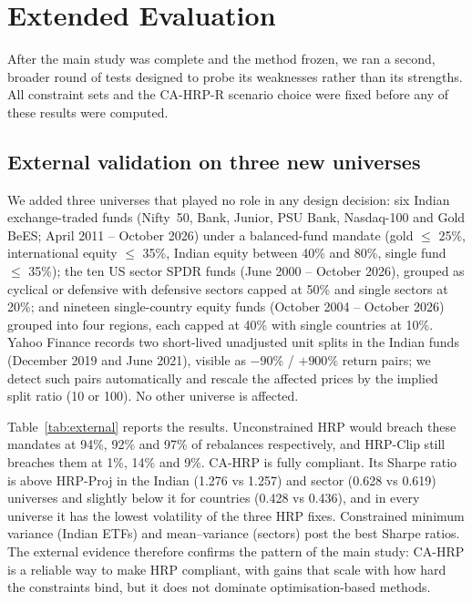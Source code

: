 \section{Extended Evaluation}\label{sec:extended}

After the main study was complete and the method frozen, we ran a second, broader round of
tests designed to probe its weaknesses rather than its strengths. All constraint sets and
the CA-HRP-R scenario choice were fixed before any of these results were computed.

\subsection{External validation on three new universes}
We added three universes that played no role in any design decision: six Indian
exchange-traded funds (Nifty~50, Bank, Junior, PSU Bank, Nasdaq-100 and Gold BeES; April
2011 -- October 2026) under a balanced-fund mandate (gold $\le$ 25\%, international equity
$\le$ 35\%, Indian equity between 40\% and 80\%, single fund $\le$ 35\%); the ten US sector
SPDR funds (June 2000 -- October 2026), grouped as cyclical or defensive with defensive
sectors capped at 50\% and single sectors at 20\%; and nineteen single-country equity funds
(October 2004 -- October 2026) grouped into four regions, each capped at 40\% with single
countries at 10\%. Yahoo Finance records two short-lived unadjusted unit splits in the
Indian funds (December 2019 and June 2021), visible as $-90\%$ / $+900\%$ return pairs; we
detect such pairs automatically and rescale the affected prices by the implied split ratio
(10 or 100). No other universe is affected.

Table~\ref{tab:external} reports the results. Unconstrained HRP would breach these mandates
at 94\%, 92\% and 97\% of rebalances respectively, and HRP-Clip still breaches them at 1\%,
14\% and 9\%. CA-HRP is fully compliant. Its Sharpe ratio is above HRP-Proj in the Indian
(1.276 vs 1.257) and sector (0.628 vs 0.619) universes and slightly below it for countries
(0.428 vs 0.436), and in every universe it has the lowest volatility of the three HRP fixes.
Constrained minimum variance (Indian ETFs) and mean--variance (sectors) post the best Sharpe
ratios. The external evidence therefore confirms the pattern of the main study: CA-HRP is a
reliable way to make HRP compliant, with gains that scale with how hard the constraints
bind, but it does not dominate optimisation-based methods.



